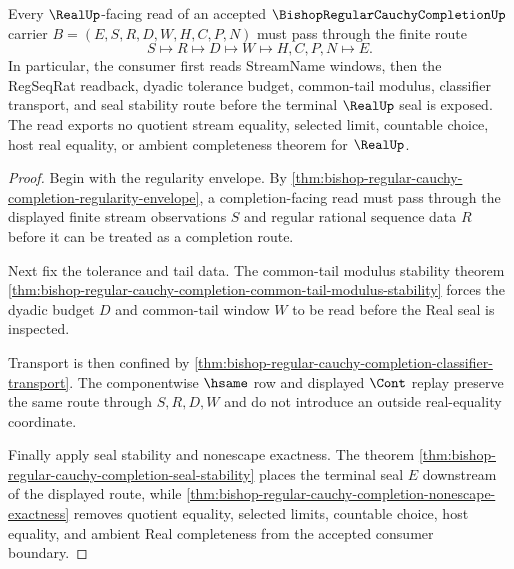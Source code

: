 \begin{theorem}
\label{thm:bishop-regular-cauchy-completion-real-seal-consumer}
Every $\RealUp$-facing read of an accepted $\BishopRegularCauchyCompletionUp$ carrier $B=(E,S,R,D,W,H,C,P,N)$ must pass through the finite route
$$
S \longmapsto R \longmapsto D \longmapsto W \longmapsto H,C,P,N \longmapsto E .
$$
In particular, the consumer first reads StreamName windows, then the RegSeqRat readback, dyadic tolerance budget, common-tail modulus, classifier transport, and seal stability route before the terminal $\RealUp$ seal is exposed. The read exports no quotient stream equality, selected limit, countable choice, host real equality, or ambient completeness theorem for $\RealUp$.
\end{theorem}
\begin{proof}
Begin with the regularity envelope. By \autoref{thm:bishop-regular-cauchy-completion-regularity-envelope}, a completion-facing read must pass through the displayed finite stream observations $S$ and regular rational sequence data $R$ before it can be treated as a completion route.

Next fix the tolerance and tail data. The common-tail modulus stability theorem \autoref{thm:bishop-regular-cauchy-completion-common-tail-modulus-stability} forces the dyadic budget $D$ and common-tail window $W$ to be read before the Real seal is inspected.

Transport is then confined by \autoref{thm:bishop-regular-cauchy-completion-classifier-transport}. The componentwise $\hsame$ row and displayed $\Cont$ replay preserve the same route through $S,R,D,W$ and do not introduce an outside real-equality coordinate.

Finally apply seal stability and nonescape exactness. The theorem \autoref{thm:bishop-regular-cauchy-completion-seal-stability} places the terminal seal $E$ downstream of the displayed route, while \autoref{thm:bishop-regular-cauchy-completion-nonescape-exactness} removes quotient equality, selected limits, countable choice, host equality, and ambient Real completeness from the accepted consumer boundary.
\end{proof}

